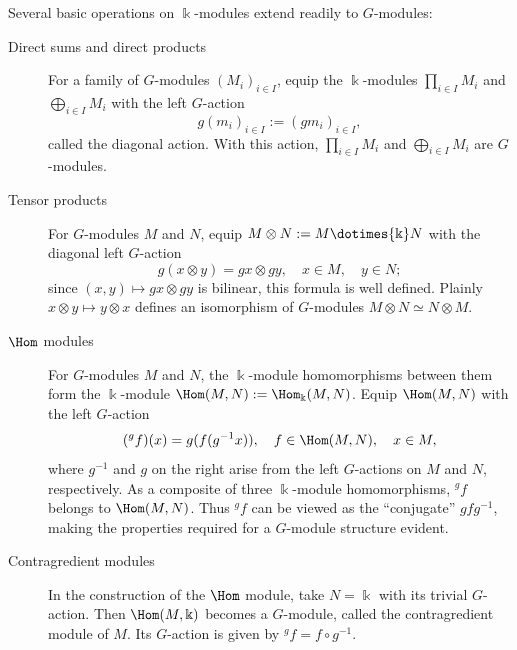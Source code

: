 Several basic operations on $\Bbbk$-modules extend readily to $G$-modules:
\begin{description}
	\item[Direct sums and direct products] For a family of $G$-modules
	$(M_i)_{i\in I}$, equip the $\Bbbk$-modules $\prod_{i\in I}M_i$ and
	$\bigoplus_{i\in I}M_i$ with the left $G$-action
	\[ g (m_i)_{i \in I} := (gm_i)_{i \in I}, \]
	called the diagonal action. With this action, $\prod_{i\in I}M_i$ and
	$\bigoplus_{i\in I}M_i$ are $G$-modules.
	\item[Tensor products] For $G$-modules $M$ and $N$, equip
	$M\otimes N:=M\dotimes{\Bbbk}N$ with the diagonal left $G$-action
	\[ g (x \otimes y) = gx \otimes gy, \quad x \in M, \quad y \in N ; \]
	since $(x,y)\mapsto gx\otimes gy$ is bilinear, this formula is well
	defined. Plainly $x\otimes y\mapsto y\otimes x$ defines an isomorphism of
	$G$-modules $M\otimes N\simeq N\otimes M$.
	\item[$\Hom$ modules] For $G$-modules $M$ and $N$, the $\Bbbk$-module
	homomorphisms between them form the $\Bbbk$-module
	$\Hom(M,N):=\Hom_{\Bbbk}(M,N)$. Equip $\Hom(M,N)$ with the left
	$G$-action
	\[ ({}^g f)(x) = g(f(g^{-1} x)), \quad f \in \Hom(M, N), \quad x \in M, \]
	where $g^{-1}$ and $g$ on the right arise from the left $G$-actions on $M$
	and $N$, respectively. As a composite of three $\Bbbk$-module
	homomorphisms, ${}^gf$ belongs to $\Hom(M,N)$. Thus ${}^gf$ can be viewed
	as the ``conjugate'' $gfg^{-1}$, making the properties required for a
	$G$-module structure evident.

	\item[Contragredient modules] In the construction of the $\Hom$ module,
	take $N=\Bbbk$ with its trivial $G$-action. Then $\Hom(M,\Bbbk)$ becomes a
	$G$-module, called the contragredient module of $M$. Its $G$-action is
	given by ${}^gf=f\circ g^{-1}$.
\end{description}

